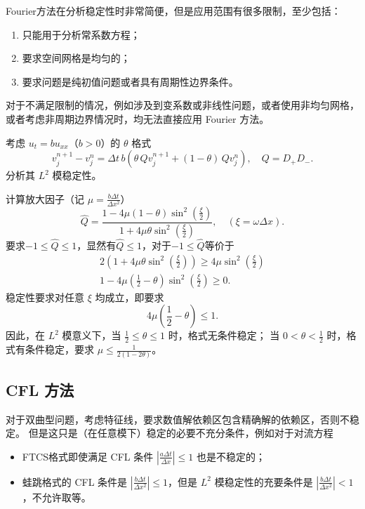 Fourier方法在分析稳定性时非常简便，但是应用范围有很多限制，至少包括：
\begin{enumerate}
    \item 只能用于分析常系数方程；
    \item 要求空间网格是均匀的；
    \item 要求问题是纯初值问题或者具有周期性边界条件。
\end{enumerate}
对于不满足限制的情况，例如涉及到变系数或非线性问题，或者使用非均匀网格，或者考虑非周期边界情况时，均无法直接应用 Fourier 方法。

\begin{example}\label{eg:theta-1}
    考虑 $u_t = b u_{xx}$（$b > 0$）的 $\theta$ 格式
    \[
        v^{n+1}_j - v^n_j = \Delta t\, b(\theta\,Q v^{n+1}_j+(1-\theta)\, Q v^n_j),\quad Q = D_+ D_-.
    \]
    分析其 $L^2$ 模稳定性。
\end{example}

\begin{solution*}
    计算放大因子（记 $\mu = \frac{b \Delta t}{\Delta x^2}$）
    \[
        \widehat{Q} = \frac{1-4\mu(1-\theta)\sin^2(\frac{\xi}2)}{1+4\mu\theta\sin^2(\frac{\xi}2)},\quad (\xi = \omega \Delta x).
    \]
    要求$-1 \le \widehat{Q} \le 1$，显然有$\widehat{Q}\le 1$，对于$-1 \le \widehat{Q}$等价于
    \begin{gather*}
        2\left(1+4\mu \theta \sin^2(\frac{\xi}2)\right) \ge 4 \mu \sin^2(\frac{\xi}2)
        \\
        1 -  4\mu(\frac12-\theta) \sin^2(\frac{\xi}2) \ge 0.
    \end{gather*}
    稳定性要求对任意 $\xi$ 均成立，即要求
    \[
        4\mu(\frac12-\theta) \le 1.
    \]
    因此，在 $L^2$ 模意义下，当 $\frac12 \le \theta \le 1$ 时，格式无条件稳定；
    当 $0 <\theta < \frac12$ 时，格式有条件稳定，要求 $\mu \le \frac{1}{2(1-2\theta)}$。
\end{solution*}

\subsection{CFL 方法}

对于双曲型问题，考虑特征线，要求数值解依赖区包含精确解的依赖区，否则不稳定。
但是这只是（在任意模下）稳定的必要不充分条件，例如对于对流方程
\begin{itemize}
    \item FTCS格式即使满足 CFL 条件 $|\frac{a \Delta t}{\Delta x}| \le 1$ 也是不稳定的；
    \item 蛙跳格式的 CFL 条件是 $|\frac{b \Delta t}{\Delta x^2}| \le 1$，但是 $L^2$ 模稳定性的充要条件是 $|\frac{b \Delta t}{\Delta x^2}| < 1$，不允许取等。
\end{itemize}

